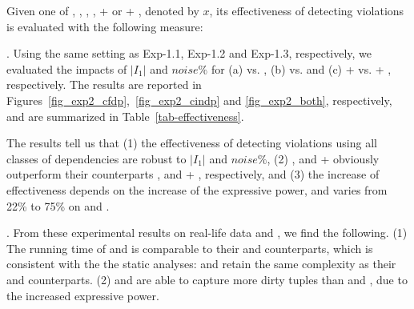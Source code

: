 \eat{%
\begin{figure}[tb!]
  \centering
  \subfigure[Varying $I_{1}|$ for \hosp]{\epsfig{file=exp-fig/23a.eps}}  %
  \quad
  \subfigure[Varying $noise\%$ for \hosp]{\epsfig{file=exp-fig/23b.eps}}
  \quad
  \subfigure[Varying $I_{1}|$ for \dblp]{\epsfig{file=exp-fig/23c.eps}}
  \quad
  \subfigure[Varying $noise\%$ for \dblp]{\epsfig{file=exp-fig/23d.eps}}
  \caption{Effectiveness of detecting \pCFD and \pCIND violations}\label{fig_exp2_both}
\end{figure}
}

Given one of \CFDs, \pCFDs, \CINDs, \pCINDs,  \CFDs + \CINDs or \pCFDs + \pCINDs, denoted by $x$, its effectiveness of detecting violations is evaluated with the following measure:

\vspace{0ex}




. Using the same setting as {Exp-1.1}, {Exp-1.2} and {Exp-1.3}, respectively, we evaluated the impacts of $|I_1|$ and $noise\%$ for
(a) {\pCFDs vs. \CFDs}, (b) {\pCINDs vs. \CINDs} and (c) {\pCFDs + \pCINDs vs. \CFDs + \CINDs}, respectively.
%
The results are reported in Figures~\ref{fig_exp2_cfdp},~\ref{fig_exp2_cindp} and \ref{fig_exp2_both}, respectively, and are summarized in Table~\ref{tab-effectiveness}.

The results tell us that (1) the effectiveness of detecting violations using all classes of dependencies are robust to $|I_1|$ and $noise\%$,
%
(2) \pCFDs, \pCINDs and \pCFDs + \pCINDs obviously outperform their counterparts \CFDs, \CINDs and \CFDs + \CINDs, respectively, and
%
(3) the increase of effectiveness depends on the increase of the expressive power, and varies from 22\% to 75\% on \hosp and \dblp.




. From these experimental results on real-life data \hosp and \dblp, we find the following.
(1) The running time of \pCFDs and \pCINDs is comparable to their \CFDs and \CINDs counterparts, which is consistent with the
the static analyses:  \pCFDs and \pCINDs retain the same complexity
as their \CFDs and \CINDs counterparts.
(2) \pCFDs and \pCINDs are able to capture more dirty tuples than \CFDs and \CINDs, due to the increased expressive power.





